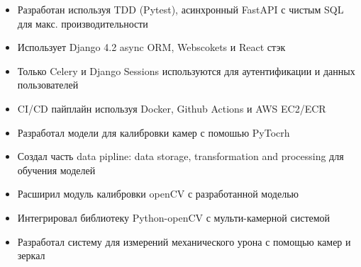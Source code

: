 \documentclass[10pt,a4paper,ragged2e,withhyper]{altacv}
\begin{document}
\begin{paracol}{2}
            \begin{itemize}
                \item Разработан используя TDD (Pytest), асинхронный FastAPI с чистым SQL для макс. производительности
            \end{itemize}
            \medskip

            \begin{itemize}
                \item Использует Django 4.2 async ORM, Webscokets и React стэк
            \end{itemize}
            \medskip

            \begin{itemize}
                \item Только Celery и Django Sessions используются для аутентификации и данных пользователей
                \item CI/CD пайплайн используя Docker, Github Actions и AWS EC2/ECR
            \end{itemize}

            \begin{itemize}
                \item Разработал модели для калибровки камер с помошью PyTocrh
                \item Создал часть data pipline: data storage,  transformation and processing для обучения моделей
                \item Расширил модуль калибровки openCV с разработанной моделью
            \end{itemize}
            \divider

            \begin{itemize}
                \item Интегрировал библиотеку Python-openCV с мульти-камерной системой
                \item Разработал систему для измерений механического урона с помощью камер и зеркал
            \end{itemize}


\end{paracol}
\end{document}
